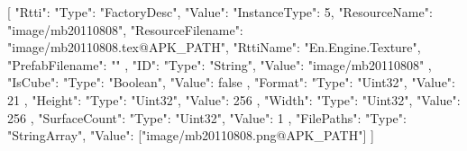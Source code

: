 [{
        "Rtti": {
            "Type": "FactoryDesc",
            "Value": {
                "InstanceType": 5,
                "ResourceName": "image/mb20110808",
                "ResourceFilename": "image/mb20110808.tex@APK_PATH",
                "RttiName": "En.Engine.Texture",
                "PrefabFilename": ""
            }
        },
        "ID": {
            "Type": "String",
            "Value": "image/mb20110808"
        },
        "IsCube": {
            "Type": "Boolean",
            "Value": false
        },
        "Format": {
            "Type": "Uint32",
            "Value": 21
        },
        "Height": {
            "Type": "Uint32",
            "Value": 256
        },
        "Width": {
            "Type": "Uint32",
            "Value": 256
        },
        "SurfaceCount": {
            "Type": "Uint32",
            "Value": 1
        },
        "FilePaths": {
            "Type": "StringArray",
            "Value": ["image/mb20110808.png@APK_PATH"]
        }
    }]